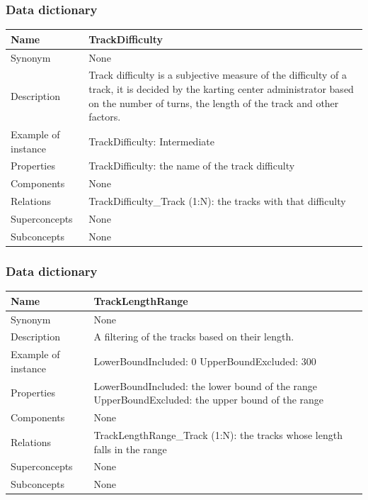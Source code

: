\documentclass{beamer}
\begin{document}
\begin{frame}
    \frametitle{Data dictionary}
    \begin{table}
    \tiny
    \begin{tabular}{|p{2cm}|p{6cm}|}
    \hline
    Name & \textbf{TrackDifficulty} \\
    \hline
    Synonym & None \\
    \hline
    Description & Track difficulty is a subjective measure of the difficulty of a track,
    it is decided by the karting center administrator based on the number of turns,
    the length of the track and other factors. \\
    \hline
    Example of instance &
    TrackDifficulty: Intermediate \\
    \hline
    Properties &
    TrackDifficulty: the name of the track difficulty \\
    \hline
    Components & None \\
    \hline
    Relations &
    TrackDifficulty\_Track (1:N): the tracks with that difficulty \\
    \hline
    Superconcepts & None \\
    \hline
    Subconcepts & None \\
    \hline
    \end{tabular}
    \end{table}
\end{frame}


\begin{frame}
    \frametitle{Data dictionary}
    \begin{table}
    \tiny
    \begin{tabular}{|p{2cm}|p{6cm}|}
    \hline
    Name & \textbf{TrackLengthRange} \\
    \hline
    Synonym & None \\
    \hline
    Description & A filtering of the tracks based on their length. \\
    \hline
    Example of instance &
    LowerBoundIncluded: 0 \newline
    UpperBoundExcluded: 300 \\
    \hline
    Properties &
    LowerBoundIncluded: the lower bound of the range \newline
    UpperBoundExcluded: the upper bound of the range \\
    \hline
    Components & None \\
    \hline
    Relations &
    TrackLengthRange\_Track (1:N): the tracks whose length falls in the range \\
    \hline
    Superconcepts & None \\
    \hline
    Subconcepts & None \\
    \hline
    \end{tabular}
    \end{table}
\end{frame}
\end{document}

